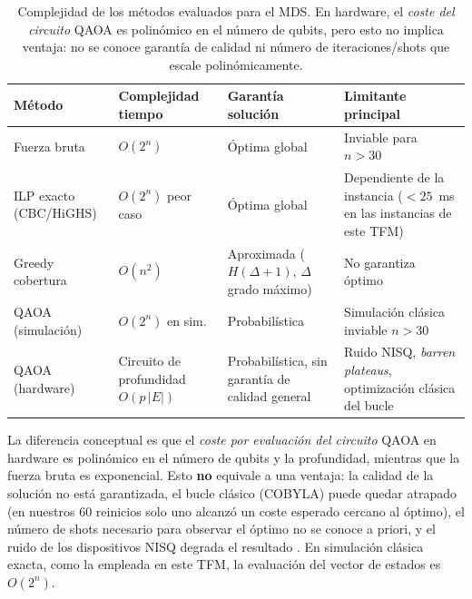 \begin{table}[ht]
\centering
\small
\begin{tabularx}{\linewidth}{>{\raggedright\arraybackslash}p{3.0cm}>{\raggedright\arraybackslash}p{3.0cm}>{\raggedright\arraybackslash}p{2.8cm}>{\raggedright\arraybackslash}X}
\hline
\textbf{Método} & \textbf{Complejidad tiempo} & \textbf{Garantía solución} & \textbf{Limitante principal} \\
\hline
Fuerza bruta       & $O(2^n)$         & Óptima global    & Inviable para $n > 30$ \\
ILP exacto (CBC/HiGHS) & $O(2^n)$ peor caso & Óptima global & Dependiente de la instancia ($<25$~ms en las instancias de este TFM) \\
Greedy cobertura   & $O(n^2)$         & Aproximada ($H(\Delta{+}1)$, $\Delta$ grado máximo) & No garantiza óptimo \\
QAOA (simulación)  & $O(2^n)$ en sim. & Probabilística   & Simulación clásica inviable $n > 30$ \\
QAOA (hardware)    & Circuito de profundidad $O(p\,|E|)$ & Probabilística, sin garantía de calidad general & Ruido NISQ, \emph{barren plateaus}, optimización clásica del bucle \\
\hline
\end{tabularx}
\caption{Complejidad de los métodos evaluados para el MDS. En hardware, el \emph{coste del circuito} QAOA es polinómico en el número de qubits, pero esto no implica ventaja: no se conoce garantía de calidad ni número de iteraciones/shots que escale polinómicamente.}
\label{tab:complejidad_mds}
\end{table}

La diferencia conceptual es que el \emph{coste por evaluación del circuito} QAOA en hardware es polinómico en el número de qubits y la profundidad, mientras que la fuerza bruta es exponencial. Esto \textbf{no} equivale a una ventaja: la calidad de la solución no está garantizada, el bucle clásico (COBYLA) puede quedar atrapado (en nuestros 60 reinicios solo uno alcanzó un coste esperado cercano al óptimo), el número de shots necesario para observar el óptimo no se conoce a priori, y el ruido de los dispositivos NISQ degrada el resultado \citep{preskill2018, cerezo2021}. En simulación clásica exacta, como la empleada en este TFM, la evaluación del vector de estados es $O(2^n)$.

